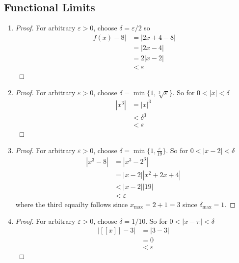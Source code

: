 \subsection{Functional Limits}

\begin{enumerate}[label=(\alph*)]
    \item 
    \begin{proof}
        For arbitrary $\varepsilon>0$, choose $\delta = \varepsilon/2$
        so
        \begin{align*}
            |f(x)-8| &= |2x+4-8| \\
                    &= |2x-4| \\
                    &= 2|x-2| \\
                    & < \varepsilon
        \end{align*}
    \end{proof}

    \item
    \begin{proof}
        For arbitrary $\varepsilon>0$, choose $\delta = \min\{ 1, \sqrt[3]{\varepsilon} \}$.
        So for $0<|x| < \delta$
        \begin{align*}
            |x^3| &= |x|^3 \\
                    &< \delta^3 \\
                    & < \varepsilon
        \end{align*}
    \end{proof}

    \item
    \begin{proof}
        For arbitrary $\varepsilon>0$, choose $\delta = \min\{ 1, \frac{\varepsilon}{19} \}$.
        So for $0<|x-2| < \delta$
        \begin{align*}
            |x^3-8| &= |x^3 - 2^3| \\
                    &= |x-2||x^2+2x+4| \\
                    & < |x-2||19|   \\
                    & < \varepsilon
        \end{align*}
        where the third equailty follows since $x_{\text{max}} = 2 + 1 = 3$ 
        since $\delta_\text{max}=1$.
    \end{proof}

    \item
    \begin{proof}
        For arbitrary $\varepsilon>0$, choose $\delta = 1/10$.
        So for $0<|x-\pi| < \delta$
        \begin{align*}
            |[[x]]- 3| &= |3 - 3| \\
                    &= 0 \\
                    & < \varepsilon
        \end{align*}
    \end{proof}
\end{enumerate}

